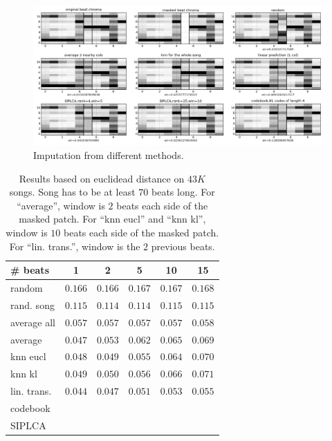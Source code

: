\documentclass{article}
\begin{document}
\begin{figure}[t]
\begin{center}
\includegraphics[width=.9\columnwidth]{imputation}
\end{center}
\caption{Imputation from different methods.}
\label{fig:imputation}
\end{figure}

\begin{table}[t]
\begin{small}
\begin{center}
\begin{tabular}{l|c|c|c|c|c|}
\# beats  & 1 & 2 & 5 & 10 & 15 \\ \hline \hline
random & $0.166$ & $0.166$ & $0.167$ & $0.167$ & $0.168$  \\
rand. song & $0.115$ & $0.114$ & $0.114$ & $0.115$ & $0.115$  \\
average all & $0.057$ & $0.057$ & $0.057$ & $0.057$ & $0.058$ \\
average & $0.047$ & $0.053$ & $0.062$ & $0.065$ & $0.069$ \\ \hline
knn eucl & $0.048$ & $0.049$ & $0.055$ & $0.064$ &  $0.070$ \\
knn kl & $0.049$ & $0.050$ & $0.056$ & $0.066$ &  $0.071$ \\
lin. trans. & $\mathbf{0.044}$ & $\mathbf{0.047}$ & $\mathbf{0.051}$ & $\mathbf{0.053}$ & $\mathbf{0.055}$ \\
codebook & & & & &  \\
SIPLCA & & & & &  \\ \hline
\end{tabular}
\caption{Results based on euclidead distance on $43K$ songs.
Song has to be at least $70$ beats long. 
For ``average'', window is $2$ beats each side of the masked patch.
For ``knn eucl'' and ``knn kl'', window is $10$ beats each side of the masked patch.
For ``lin. trans.'', window is the $2$ previous beats.}
\label{tab:reseucl}
\end{center}
\end{small}
\end{table}
\end{document}
